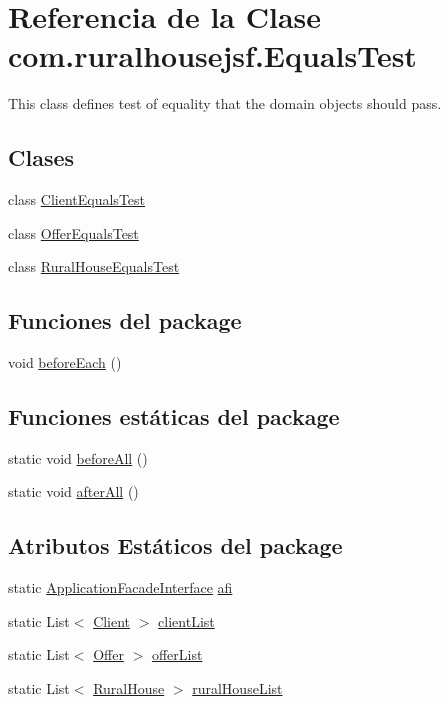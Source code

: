 \hypertarget{a00248}{}\section{Referencia de la Clase com.\+ruralhousejsf.\+Equals\+Test}
\label{a00248}


This class defines test of equality that the domain objects should pass.  


\subsection*{Clases}
\begin{DoxyCompactItemize}
\item 
class \mbox{\hyperlink{a00252}{Client\+Equals\+Test}}
\item 
class \mbox{\hyperlink{a00260}{Offer\+Equals\+Test}}
\item 
class \mbox{\hyperlink{a00256}{Rural\+House\+Equals\+Test}}
\end{DoxyCompactItemize}
\subsection*{Funciones del \textquotesingle{}package\textquotesingle{}}
\begin{DoxyCompactItemize}
\item 
void \mbox{\hyperlink{a00248_ac6b6f6de31519a6882e0ec812b03442c}{before\+Each}} ()
\end{DoxyCompactItemize}
\subsection*{Funciones estáticas del \textquotesingle{}package\textquotesingle{}}
\begin{DoxyCompactItemize}
\item 
static void \mbox{\hyperlink{a00248_a114c96cfa4dbde48a42802952f8cd5b0}{before\+All}} ()
\item 
static void \mbox{\hyperlink{a00248_afea5be25670fd0d03ebb37e737bda19b}{after\+All}} ()
\end{DoxyCompactItemize}
\subsection*{Atributos Estáticos del \textquotesingle{}package\textquotesingle{}}
\begin{DoxyCompactItemize}
\item 
static \mbox{\hyperlink{a00136}{Application\+Facade\+Interface}} \mbox{\hyperlink{a00248_a51e738cac64499dfd6d290d8f70ec8ce}{afi}}
\item 
static List$<$ \mbox{\hyperlink{a00164}{Client}} $>$ \mbox{\hyperlink{a00248_a313faa108d9cc5b97c40bf50af089c87}{client\+List}}
\item 
static List$<$ \mbox{\hyperlink{a00184}{Offer}} $>$ \mbox{\hyperlink{a00248_abf5b3398125f0ed991c84afb429512f4}{offer\+List}}
\item 
static List$<$ \mbox{\hyperlink{a00188}{Rural\+House}} $>$ \mbox{\hyperlink{a00248_a9bdc3ab9b2c103383f6c34f253fe8307}{rural\+House\+List}}
\end{DoxyCompactItemize}
